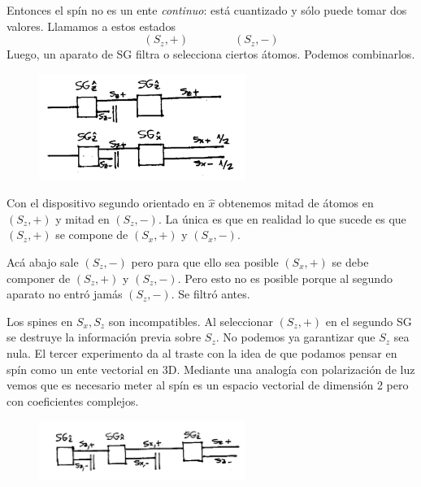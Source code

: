 \documentclass[10pt,oneside]{CBFT_book}
\begin{document}
Entonces el spín no es un ente {\it continuo}: está cuantizado y sólo puede tomar dos valores.
Llamamos a estos estados
\[
	(S_z,+) \qquad \qquad (S_z,-)
\]
Luego, un aparato de SG filtra o selecciona ciertos átomos. Podemos combinarlos.

\begin{figure}[htb]
	\begin{center}
	\includegraphics[width=0.6\textwidth]{images/teo2_3.pdf}	 
	\end{center}
	\caption{}
\end{figure} 

Con el dispositivo segundo orientado en $\hat{x}$ obtenemos mitad de átomos en
$(S_z,+)$ y mitad en $(S_z,-)$. La única es que en realidad lo que sucede es que 
$(S_z,+)$ se compone de $(S_x,+)$ y $(S_x,-)$.

Acá abajo sale $(S_z,-)$ pero para que ello sea posible 
$(S_x,+)$ se debe componer de $(S_z,+)$ y $(S_z,-)$. Pero esto no es posible
porque al segundo aparato no entró jamás $(S_z,-)$. Se filtró antes.

Los spines en $S_x, S_z$ son incompatibles. Al seleccionar $(S_z,+)$ en el segundo
SG se destruye la información previa sobre $S_z$. No podemos ya garantizar que $S_z$
sea nula.
El tercer experimento da al traste con la idea de que podamos pensar en spín como un
ente vectorial en 3D. Mediante una analogía con polarización de luz vemos que es necesario
meter al spín es un espacio vectorial de dimensión 2 pero con coeficientes complejos.

\begin{figure}[htb]
	\begin{center}
	\includegraphics[width=0.6\textwidth]{images/teo2_4.pdf}	 
	\end{center}
	\caption{}
\end{figure} 



\end{document}
